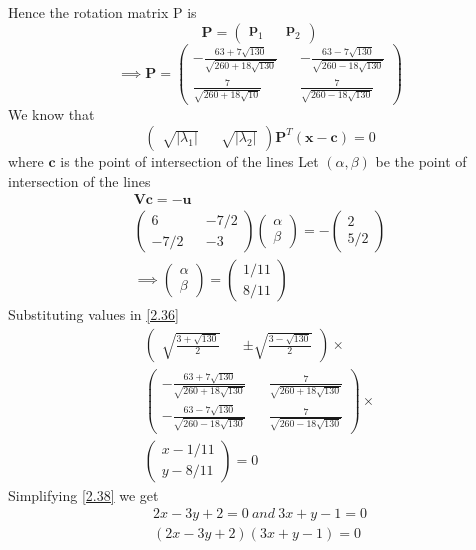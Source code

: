 \documentclass[journal,13pt,twocolumn]{IEEEtran}
\newcommand{\myvec}[1]{\ensuremath{\begin{pmatrix}#1\end{pmatrix}}}
\renewcommand{\vec}[1]{\mathbf{#1}}
\begin{document}
Hence the rotation matrix P is
\begin{equation} \label{2.34}
\vec{P} = \myvec{\vec{p}_1 && \vec{p}_2}
\end{equation}
\begin{equation} \label{2.35}
\implies \vec{P} = \myvec{-\frac{63+7\sqrt{130}}{\sqrt{260+18\sqrt{130}}} && -\frac{63-7\sqrt{130}}{\sqrt{260-18\sqrt{130}}} \\ \frac{7}{\sqrt{260+18\sqrt{10}}} && \frac{7}{\sqrt{260-18\sqrt{130}}}}
\end{equation}
We know that 
\begin{equation}\label{2.36}
\myvec{\sqrt{|\lambda_1|} && \sqrt{|\lambda_2|}}\vec{P}^T(\vec{x}-\vec{c}) = 0
\end{equation}
where $\vec{c}$ is the point of intersection of the lines 
Let $(\alpha,\beta)$ be the point of intersection of the lines 
\begin{equation} \label{2.37}
\begin{split}
\vec{V}\vec{c} = -\vec{u}\\
\myvec{6 && -7/2\\-7/2 && -3} \myvec{\alpha \\ \beta} = -\myvec{2 \\ 5/2}\\
\implies \myvec{\alpha \\ \beta} = \myvec{1/11 \\ 8/11}
\end{split}
\end{equation}
Substituting values in \eqref{2.36}
\begin{equation} \label{2.38}
\begin{split}
\myvec{ \sqrt{\frac{3+\sqrt{130}}{2}} && \pm\sqrt{\frac{3-\sqrt{130}}{2}}} \times \\
\myvec{ -\frac{63+7\sqrt{130}}{\sqrt{260+18\sqrt{130}}} && \frac{7}{\sqrt{260+18\sqrt{130}}} \\ -\frac{63-7\sqrt{130}}{\sqrt{260-18\sqrt{130}}} && \frac{7}{\sqrt{260-18\sqrt{130}}}} \times \\
\myvec{x-1/11 \\ y-8/11} = 0
\end{split}
\end{equation}
Simplifying \eqref{2.38} we get 
\begin{equation} \label{2.39}
\begin{split}
2x - 3y + 2 = 0~ and ~3x + y - 1 = 0\\
\boxed{(2x - 3y + 2)(3x + y - 1) = 0}
\end{split}
\end{equation}
\end{document}
